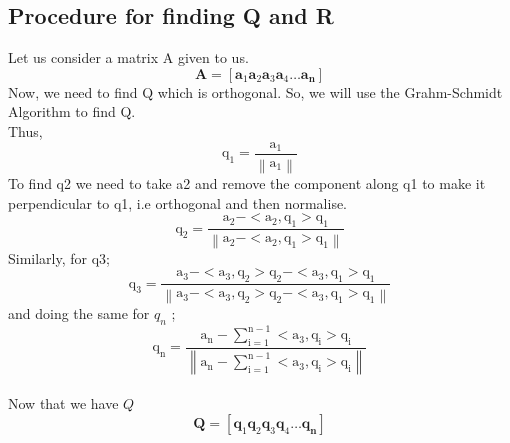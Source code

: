 \documentclass[12pt]{article}
\begin{document}
\subsection{Procedure for finding Q and R}
Let us consider a matrix A given to us.
\begin{equation*}
    \mathbf{A}=\left[\mathbf{a}_{1} \mathbf{a}_{2} \mathbf{a}_{3} \mathbf{a}_{4} \ldots \mathbf{a}_{\mathbf{n}}\right]
\end{equation*}
Now, we need to find Q which is orthogonal. So, we will use the Grahm-Schmidt Algorithm to find Q.\\
Thus, 
\begin{equation*}
    \mathrm{q}_{1}=\frac{\mathrm{a}_{1}}{\left\|\mathrm{a}_{1}\right\|}
\end{equation*}
To find q2 we need to take a2 and remove the component along q1 to make it perpendicular to q1, i.e orthogonal and then normalise.
\begin{equation*}
    \mathrm{q}_{2}=\frac{\mathrm{a}_{2}-<\mathrm{a}_{2}, \mathrm{q}_{1}>\mathrm{q}_{1}}{\left\|\mathrm{a}_{2}-<\mathrm{a}_{2}, \mathrm{q}_{1}>\mathrm{q}_{1}\right\|}
\end{equation*}
Similarly, for q3; 
\begin{equation*}
    \mathrm{q}_{3}=\frac{\mathrm{a}_{3}-<\mathrm{a}_{3}, \mathrm{q}_{2}>\mathrm{q}_{2}-<\mathrm{a}_{3}, \mathrm{q}_{1}>\mathrm{q}_{1}}{\left\|\mathrm{a}_{3}-<\mathrm{a}_{3}, \mathrm{q}_{2}>\mathrm{q}_{2}-<\mathrm{a}_{3}, \mathrm{q}_{1}>\mathrm{q}_{1}\right\|}
\end{equation*}
and doing the same for $q_n$ ;
\begin{equation*}
    \mathrm{q}_{\mathrm{n}}=\frac{\mathrm{a}_{\mathrm{n}}-\sum_{\mathrm{i}=1}^{\mathrm{n}-1}<\mathrm{a}_{3}, \mathrm{q}_{\mathrm{i}}>\mathrm{q}_{\mathrm{i}}}{\left\|\mathrm{a}_{\mathrm{n}}-\sum_{\mathrm{i}=1}^{\mathrm{n}-1}<\mathrm{a}_{3}, \mathrm{q}_{\mathrm{i}}>\mathrm{q}_{\mathrm{i}}\right\|}
\end{equation*}
\\
Now that we have $Q$
\begin{equation*}
    \mathbf{Q}=\left[\mathbf{q}_{1} \mathbf{q}_{2} \mathbf{q}_{3} \mathbf{q}_{4} \ldots \mathbf{q}_{\mathbf{n}}\right]
\end{equation*}
\end{document}
